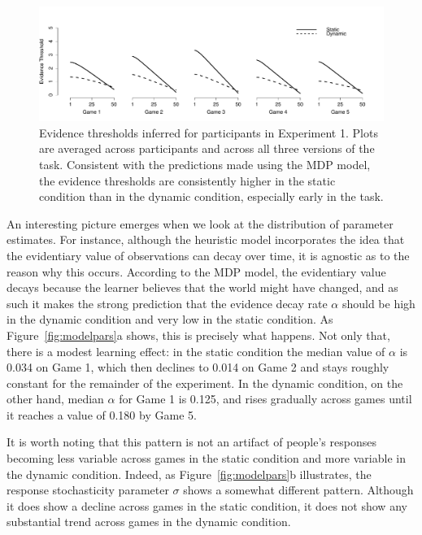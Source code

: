 \documentclass[authoryear]{elsarticle}
\begin{document}
\begin{figure}[p]
\begin{center}
\includegraphics[scale=.4]{inferredthresholds.pdf}
\caption{Evidence thresholds inferred for participants in Experiment 1. Plots are averaged across participants and across all three versions of the task. Consistent with the predictions made using the MDP model, the evidence thresholds are consistently higher in the static condition than in the dynamic condition, especially early in the task.}
\label{fig:inferredthresholds}
\end{center}
\end{figure}


An interesting picture emerges when we look at the distribution of parameter estimates. For instance, although the heuristic model incorporates the idea that the evidentiary value of observations can decay over time, it is agnostic as to the reason why this occurs. According to the MDP model, the evidentiary value decays because the learner believes that the world might have changed, and as such it makes the strong prediction that the evidence decay rate $\alpha$ should be high in the dynamic condition and very low in the static condition. As Figure~\ref{fig:modelpars}a shows, this is precisely what happens. Not only that, there is a modest learning effect: in the static condition the median value of $\alpha$ is 0.034 on Game 1, which then declines to 0.014 on Game 2 and stays roughly constant for the remainder of the experiment. In the dynamic condition, on the other hand, median $\alpha$ for Game 1 is 0.125, and rises gradually across games until it reaches a value of 0.180 by Game 5.

It is worth noting that this pattern is not an artifact of people's responses becoming less variable across games in the static condition and more variable in the dynamic condition. Indeed, as Figure~\ref{fig:modelpars}b illustrates, the response stochasticity parameter $\sigma$ shows a somewhat different pattern. Although it does show a decline across games in the static condition, it does not show any substantial trend across games in the dynamic condition.
\end{document}
